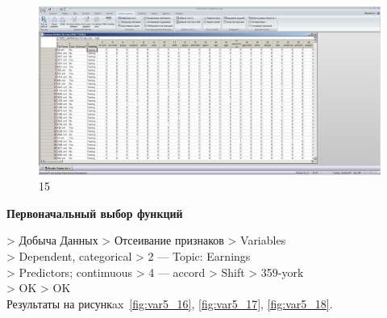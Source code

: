 \begin{figure}[p!h]
  \centering

  \includegraphics[width=17cm]
  {inc/var5/15.PNG}

  \caption{15}

  \label{fig:var5_15}
\end{figure}

\newpage

\begin{center}
  \textbf{Первоначальный выбор функций}
\end{center}

> Добыча Данных > Отсеивание признаков > Variables \\
> Dependent, categorical > 2 — Topic: Earnings \\
> Predictors; contimuous > 4 — accord > Shift > 359-york \\
> OK > OK \\

Результаты на рисункax~\ref{fig:var5_16}, \ref{fig:var5_17}, \ref{fig:var5_18}.


